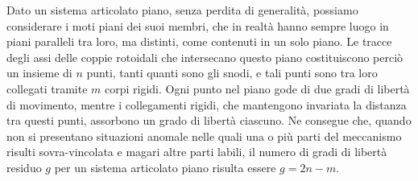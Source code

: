 \noindent Dato un sistema articolato piano, senza perdita di generalit\`a, possiamo
considerare i moti piani dei suoi membri, che in realt\`a hanno sempre luogo
in piani paralleli tra loro, ma distinti, come contenuti in un solo piano. Le tracce degli assi delle coppie rotoidali che intersecano questo piano costituiscono perci\`o
un insieme di $n$ punti, tanti quanti sono gli snodi, e tali punti sono tra loro
collegati tramite $m$ corpi rigidi. Ogni punto nel piano gode di due gradi di
libert\`a di movimento, mentre i collegamenti rigidi, che mantengono invariata
la distanza tra questi punti, assorbono un grado di libert\`a ciascuno.
Ne consegue che, quando non si presentano situazioni anomale nelle quali una o 
pi\`u parti del meccanismo risulti sovra-vincolata e magari altre parti labili,
il numero di gradi di libert\`a residuo $g$ per un sistema articolato piano 
risulta essere $g=2n - m$.

